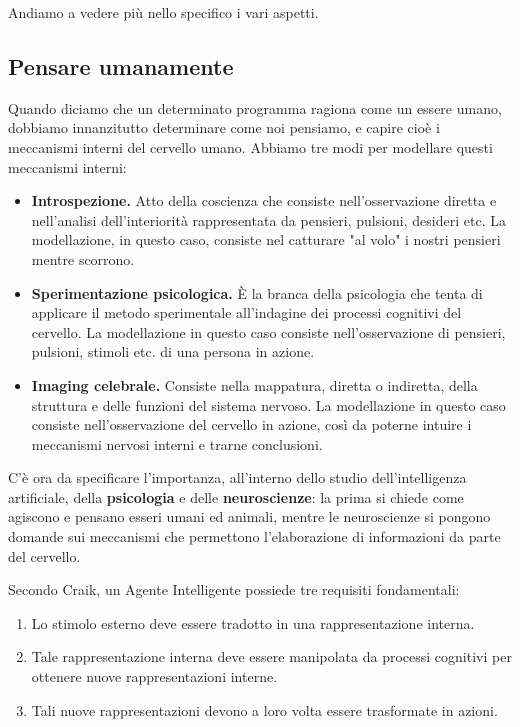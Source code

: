     Andiamo a vedere più nello specifico i vari aspetti.
    
    \subsection{Pensare umanamente}
        Quando diciamo che un determinato programma ragiona come un essere umano, dobbiamo innanzitutto determinare come noi pensiamo, e capire cioè i meccanismi interni del cervello umano. Abbiamo tre modi per modellare questi meccanismi interni:
        \begin{itemize}
            \item \textbf{Introspezione.} Atto della coscienza che consiste nell'osservazione diretta e nell'analisi dell'interiorità rappresentata da pensieri, pulsioni, desideri etc. La modellazione, in questo caso, consiste nel catturare "al volo" i nostri pensieri mentre scorrono.
            \item \textbf{Sperimentazione psicologica.} È la branca della psicologia che tenta di applicare il metodo sperimentale all'indagine dei processi cognitivi del cervello. La modellazione in questo caso consiste nell'osservazione di pensieri, pulsioni, stimoli etc. di una persona in azione.
            \item \textbf{Imaging celebrale.} Consiste nella mappatura, diretta o indiretta, della struttura e delle funzioni del sistema nervoso. La modellazione in questo caso consiste nell'osservazione del cervello in azione, così da poterne intuire i meccanismi nervosi interni e trarne conclusioni.
        \end{itemize}
        
        C'è ora da specificare l'importanza, all'interno dello studio dell'intelligenza artificiale, della \textbf{psicologia} e delle \textbf{neuroscienze}: la prima si chiede come agiscono e pensano esseri umani ed animali, mentre le neuroscienze si pongono domande sui meccanismi che permettono l'elaborazione di informazioni da parte del cervello.
        
        Secondo Craik, un Agente Intelligente possiede tre requisiti fondamentali:
        \begin{enumerate}
            \item Lo stimolo esterno deve essere tradotto in una rappresentazione interna.
            \item Tale rappresentazione interna deve essere manipolata da processi cognitivi per ottenere nuove rappresentazioni interne.
            \item Tali nuove rappresentazioni devono a loro volta essere trasformate in azioni.
        \end{enumerate}
        
